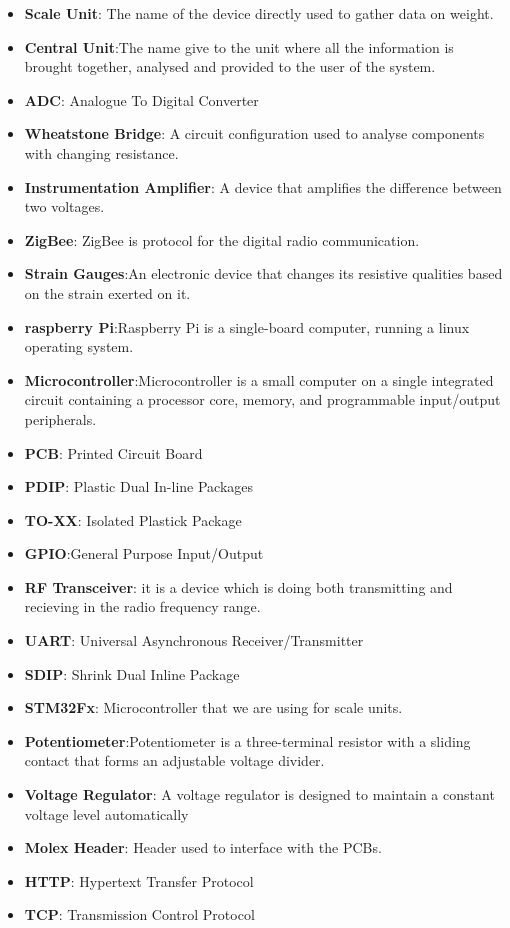 \begin{itemize}
	\item \textbf{Scale Unit}: The name of the device directly used to gather data on weight.
	\item \textbf{Central Unit}:The name give to the unit where all the information is brought together, analysed and provided to the user of the system.
	\item \textbf{ADC}: Analogue To Digital Converter
	\item \textbf{Wheatstone Bridge}: A circuit configuration used to analyse components with changing resistance.
	\item \textbf{Instrumentation Amplifier}: A device that amplifies the difference between two voltages. 
	\item \textbf{ZigBee}: ZigBee is protocol for the digital radio communication.
	\item \textbf{Strain Gauges}:An electronic device that changes its resistive qualities based on the strain exerted on it.
	\item \textbf{raspberry Pi}:Raspberry Pi is a single-board computer, running a linux operating system.
	\item \textbf{Microcontroller}:Microcontroller is a small computer on a single integrated circuit containing a processor core, memory, and programmable input/output peripherals.
	\item \textbf{PCB}: Printed Circuit Board
	\item \textbf{PDIP}: Plastic Dual In-line Packages
	\item \textbf{TO-XX}: Isolated Plastick Package
	\item \textbf{GPIO}:General Purpose Input/Output
	\item \textbf{RF Transceiver}: it is a device which is doing both transmitting and recieving in the radio frequency range.
	\item \textbf{UART}: Universal Asynchronous Receiver/Transmitter
	\item \textbf{SDIP}: Shrink Dual Inline Package
	\item \textbf{STM32Fx}: Microcontroller that we are using for scale units.
	\item \textbf{Potentiometer}:Potentiometer is a three-terminal resistor with a sliding contact that forms an adjustable voltage divider.
	\item \textbf{Voltage Regulator}: A voltage regulator is designed to maintain a constant voltage level automatically
	\item \textbf{Molex Header}: Header used to interface with the PCBs.
	\item \textbf{HTTP}: Hypertext Transfer Protocol
	\item \textbf{TCP}: Transmission Control Protocol
\end{itemize}
